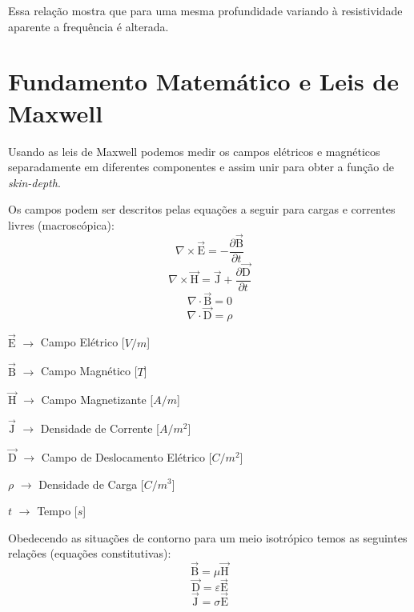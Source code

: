 	Essa relação mostra que para uma mesma profundidade variando à resistividade
	aparente a frequência é alterada.


    \section{Fundamento Matemático e Leis de Maxwell}
	\label{mat_maxwell}

	Usando as leis de Maxwell \cite{eletromag8hayt} podemos medir os campos elétricos
	e magnéticos separadamente em diferentes componentes e assim unir para obter a 
	função de \textit{skin-depth}.
	
	Os campos podem ser descritos pelas equações a seguir para cargas e correntes livres
	(macroscópica):
	    \begin{equation}
		\label{rot_elet_max}
		\nabla \times \vec{\textrm{E}}=-\frac{\partial \vec{\textrm{B}}}{\partial t} 
	    \end{equation}
	    \begin{equation}
		\label{rot_mag_max}
 		\nabla \times \vec{\textrm{H}} = \vec{\textrm{J}} + \frac{\partial \vec{\textrm{D}}}{\partial t}
	    \end{equation}
	    \begin{equation}
 		\nabla \cdot \vec{\textrm{B}} = 0
	    \end{equation}
	    \begin{equation}
 		\nabla \cdot \vec{\textrm{D}} = \rho
	    \end{equation}

	    $\vec{\textrm{E}}$ $\rightarrow$ Campo Elétrico [$V/m$]
	    
	    $\vec{\textrm{B}}$ $\rightarrow$ Campo Magnético [$T$]
	    
	    $\vec{\textrm{H}}$ $\rightarrow$ Campo Magnetizante [$A/m$]
	    
	    $\vec{\textrm{J}}$ $\rightarrow$ Densidade de Corrente [$A/m^2$]
	    
	    $\vec{\textrm{D}}$ $\rightarrow$ Campo de Deslocamento Elétrico [$C/m^2$]
	    
	    $\rho$ $\rightarrow$ Densidade de Carga [$C/m^3$]
	    
	    $t$ $\rightarrow$ Tempo [$s$]

	    Obedecendo as situações de contorno para um meio isotrópico temos as seguintes
	    relações (equações constitutivas):
	    \begin{equation}
	      \label{con_B}
	      \vec{\textrm{B}} = \mu \vec{\textrm{H}}
	    \end{equation}
	    \begin{equation}
	      \label{con_D}
	      \vec{\textrm{D}} = \varepsilon  \vec{\textrm{E}}
	    \end{equation}
	    \begin{equation}
	      \label{con_J}
	      \vec{\textrm{J}} = \sigma \vec{\textrm{E}}
	    \end{equation}
	    
